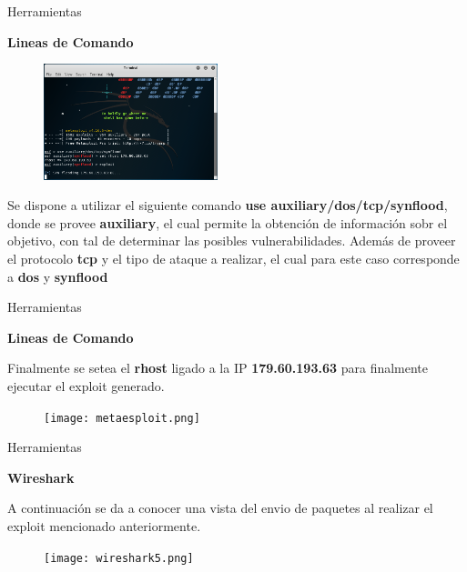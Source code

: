 \begin{frame}[t,fragile]{Herramientas}

\textbf{Lineas de Comando}

\begin{figure} 
\vspace{2pt}
  \begin{center}
    \includegraphics[width=0.45\textwidth]{sploit.png}
    \label{fig:databaseUserTable}
  \end{center}
  \vspace{2pt}
\end{figure} 

\bigskip

Se dispone a utilizar el siguiente comando \textbf{use auxiliary/dos/tcp/synflood}, donde se provee \textbf{auxiliary}, el cual permite la obtención de información sobr el objetivo, con tal de determinar las posibles vulnerabilidades. Además de proveer el protocolo \textbf{tcp} y  el tipo de ataque a realizar, el cual para este caso corresponde a \textbf{dos} y \textbf{synflood} 

\end{frame}

\begin{frame}[t,fragile]{Herramientas}

\textbf{Lineas de Comando}

\bigskip

Finalmente se setea el \textbf{rhost} ligado a la IP \textbf{179.60.193.63} para finalmente ejecutar el exploit generado.

\begin{figure}[!h]
    \centering
    \texttt{[image: metaesploit.png]}
    \label{fig:my_label}
    \end{figure}

\end{frame}



\begin{frame}[t,fragile]{Herramientas}

\textbf{Wireshark}

\bigskip

A continuación se da a conocer una vista del envio de paquetes al realizar el exploit mencionado anteriormente.

\begin{figure}[!h]
    \centering
    \texttt{[image: wireshark5.png]}
    \label{fig:my_label}
    \end{figure}

\end{frame}


